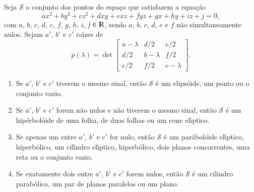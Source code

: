 \begin{teorema}
  Seja $\mathcal{S}$ o conjunto dos pontos do espa\c{c}o que satisfazem a equa\c{c}\~ao
  \[
    ax^2 + by^2 + cz^2 + dxy + exz + fyz + gx + hy + iz + j = 0,
  \]
  com $a$, $b$, $c$, $d$, $e$, $f$, $g$, $h$, $i$, $j \in \mathbb{R}$, sendo $a$, $b$, $c$, $d$, $e$ e $f$ n\~ao simultaneamente nulos. Sejam $a'$, $b'$ e $c'$ ra{\'\i}zes de
  \[
    p(\lambda) = \det \begin{bmatrix}
      a - \lambda & d/2 & e/2 \\
      d/2 & b - \lambda & f/2\\
      e/2 & f/2 & c - \lambda
    \end{bmatrix}.
  \]
  \begin{enumerate}[label=({\roman*})]
    \item Se $a'$, $b'$ e $c'$ tiverem o mesmo sinal, ent\~ao $\mathcal{S}$ \'e um elips\'oide, um ponto ou o conjunto vazio.
    \item Se $a'$, $b'$ e $c'$ forem n\~ao nulos e n\~ao tiverem o mesmo sinal, ent\~ao $\mathcal{S}$ \'e um hip\'erbol\'oide de uma folha, de duas folhas ou um cone el{\'\i}ptico.
    \item Se apenas um entre $a'$, $b'$ e $c'$ for nulo, ent\~ao $\mathcal{S}$ \'e um par\'abol\'oide el{\'\i}ptico, hiperb\'olico, um cil{\'\i}ndro el{\'\i}ptico, hiperb\'olico, dois planos concorrentes, uma reta ou o conjunto vazio.
    \item Se exatamente dois entre $a'$, $b'$ e $c'$ forem nulos, ent\~ao $\mathcal{S}$ \'e um cilindro parab\'olico, um par de planos paralelos ou um plano.
  \end{enumerate}
\end{teorema}

